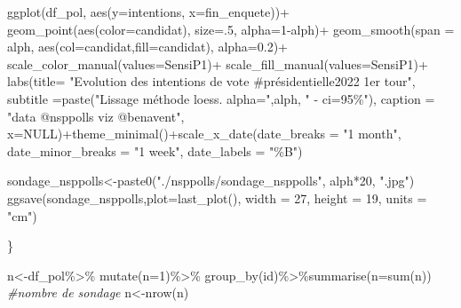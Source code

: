 \documentclass[
]{book}
\newenvironment{Shaded}{\begin{snugshade}}{\end{snugshade}}
\newcommand{\AttributeTok}[1]{\textcolor[rgb]{0.77,0.63,0.00}{#1}}
\newcommand{\CommentTok}[1]{\textcolor[rgb]{0.56,0.35,0.01}{\textit{#1}}}
\newcommand{\ConstantTok}[1]{\textcolor[rgb]{0.00,0.00,0.00}{#1}}
\newcommand{\DecValTok}[1]{\textcolor[rgb]{0.00,0.00,0.81}{#1}}
\newcommand{\FloatTok}[1]{\textcolor[rgb]{0.00,0.00,0.81}{#1}}
\newcommand{\FunctionTok}[1]{\textcolor[rgb]{0.00,0.00,0.00}{#1}}
\newcommand{\NormalTok}[1]{#1}
\newcommand{\OtherTok}[1]{\textcolor[rgb]{0.56,0.35,0.01}{#1}}
\newcommand{\SpecialCharTok}[1]{\textcolor[rgb]{0.00,0.00,0.00}{#1}}
\newcommand{\StringTok}[1]{\textcolor[rgb]{0.31,0.60,0.02}{#1}}
\begin{document}
\begin{Shaded}
\begin{Highlighting}[]
\FunctionTok{ggplot}\NormalTok{(df\_pol, }\FunctionTok{aes}\NormalTok{(}\AttributeTok{y=}\NormalTok{intentions, }\AttributeTok{x=}\NormalTok{fin\_enquete))}\SpecialCharTok{+}
  \FunctionTok{geom\_point}\NormalTok{(}\FunctionTok{aes}\NormalTok{(}\AttributeTok{color=}\NormalTok{candidat), }\AttributeTok{size=}\NormalTok{.}\DecValTok{5}\NormalTok{, }\AttributeTok{alpha=}\DecValTok{1}\SpecialCharTok{{-}}\NormalTok{alph)}\SpecialCharTok{+}
  \FunctionTok{geom\_smooth}\NormalTok{(}\AttributeTok{span =}\NormalTok{ alph, }\FunctionTok{aes}\NormalTok{(}\AttributeTok{col=}\NormalTok{candidat,}\AttributeTok{fill=}\NormalTok{candidat), }\AttributeTok{alpha=}\FloatTok{0.2}\NormalTok{)}\SpecialCharTok{+}
  \FunctionTok{scale\_color\_manual}\NormalTok{(}\AttributeTok{values=}\NormalTok{SensiP1)}\SpecialCharTok{+}  
  \FunctionTok{scale\_fill\_manual}\NormalTok{(}\AttributeTok{values=}\NormalTok{SensiP1)}\SpecialCharTok{+} 
  \FunctionTok{labs}\NormalTok{(}\AttributeTok{title=} \StringTok{"Evolution des intentions de vote \#présidentielle2022 1er tour"}\NormalTok{,}
       \AttributeTok{subtitle =}\FunctionTok{paste}\NormalTok{(}\StringTok{"Lissage méthode loess. alpha="}\NormalTok{,alph, }\StringTok{" {-} ci=95\%"}\NormalTok{),}
       \AttributeTok{caption =} \StringTok{"data @nsppolls viz @benavent"}\NormalTok{,}
       \AttributeTok{x=}\ConstantTok{NULL}\NormalTok{)}\SpecialCharTok{+}\FunctionTok{theme\_minimal}\NormalTok{()}\SpecialCharTok{+}\FunctionTok{scale\_x\_date}\NormalTok{(}\AttributeTok{date\_breaks =} \StringTok{"1 month"}\NormalTok{, }\AttributeTok{date\_minor\_breaks =} \StringTok{"1 week"}\NormalTok{,}
             \AttributeTok{date\_labels =} \StringTok{"\%B"}\NormalTok{)}

\NormalTok{sondage\_nsppolls}\OtherTok{\textless{}{-}}\FunctionTok{paste0}\NormalTok{(}\StringTok{"./nsppolls/sondage\_nsppolls"}\NormalTok{, alph}\SpecialCharTok{*}\DecValTok{20}\NormalTok{, }\StringTok{".jpg"}\NormalTok{)}
\FunctionTok{ggsave}\NormalTok{(sondage\_nsppolls,}\AttributeTok{plot=}\FunctionTok{last\_plot}\NormalTok{(), }\AttributeTok{width =} \DecValTok{27}\NormalTok{, }\AttributeTok{height =} \DecValTok{19}\NormalTok{, }\AttributeTok{units =} \StringTok{"cm"}\NormalTok{)}

\NormalTok{\}}


\NormalTok{n}\OtherTok{\textless{}{-}}\NormalTok{df\_pol}\SpecialCharTok{\%\textgreater{}\%}
  \FunctionTok{mutate}\NormalTok{(}\AttributeTok{n=}\DecValTok{1}\NormalTok{)}\SpecialCharTok{\%\textgreater{}\%}
  \FunctionTok{group\_by}\NormalTok{(id)}\SpecialCharTok{\%\textgreater{}\%}\FunctionTok{summarise}\NormalTok{(}\AttributeTok{n=}\FunctionTok{sum}\NormalTok{(n))}
\CommentTok{\#nombre de sondage}
\NormalTok{n}\OtherTok{\textless{}{-}}\FunctionTok{nrow}\NormalTok{(n)}
\end{Highlighting}
\end{Shaded}
\end{document}
